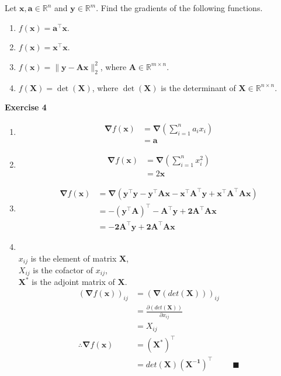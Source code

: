 \documentclass[11pt,letter,notitlepage]{article}
\begin{document}
\begin{exercise} 
	Let $\mathbf{x},\mathbf{a}\in \mathbb{R}^n$ and $\mathbf{y}\in \mathbb{R}^m$. Find the gradients of the following functions.
	\begin{enumerate}
	    \item $f(\mathbf{x}) = \mathbf{a}^{\top}\mathbf{x}$.
	    \item $f(\mathbf{x}) = \mathbf{x}^{\top}\mathbf{x}$.
	    \item $f(\mathbf{x})=\| \mathbf{y} - \mathbf{A}\mathbf{x} \|_2^2$, where $\mathbf{A}\in\mathbb{R}^{m\times n}$.
	    \item  $f(\mathbf{X}) = \det(\mathbf{X})$, where $\det(\mathbf{X})$ is the determinant of $\mathbf{X} \in \mathbb{R}^{n \times n}$.
	\end{enumerate}
\end{exercise}

\begin{solution}
	\textbf{Exercise 4}
	\begin{enumerate}
		\item
		\begin{align*}
			\mathbf{\nabla}f(\mathbf{x})
			&=\mathbf{\nabla}(\sum_{i=1}^{n}{a_ix_i})\\
			&=\mathbf{a}
		\end{align*}
		
		\item
		\begin{align*}
			\mathbf{\nabla}f(\mathbf{x})
			&=\mathbf{\nabla}(\sum_{i=1}^{n}{x_i^2})\\
			&=2\mathbf{x}
		\end{align*}
		
		\item
		\begin{align*}
			\mathbf{\nabla}f(\mathbf{x})
			&=\mathbf{\nabla}(\mathbf{y^{\top}y-y^{\top}Ax-x^{\top}A^{\top}y+x^{\top}A^{\top}Ax})\\
			&=\mathbf{-(y^{\top}A)^{\top}-A^{\top}y+2A^{\top}Ax}\\
			&=\mathbf{-2A^{\top}y+2A^{\top}Ax}
		\end{align*}
		
		\item ~\\
		$x_{ij}$ is the element of matrix $\mathbf{X}$,\\ $X_{ij}$ is the cofactor of $x_{ij}$, \\$\mathbf{X^*}$ is the adjoint matrix of $\mathbf{X}$.
		\begin{align*}
			(\mathbf{\nabla}f(\mathbf{x}))_{ij}
			&=(\mathbf{\nabla}(det(\mathbf{X})))_{ij}\\
			&=\frac{\partial (det(\mathbf{X}))}{\partial x_{ij}}\\
			&=X_{ij}\\
			\therefore \mathbf{\nabla}f(\mathbf{x})
			&=\mathbf{(X^{*})^{\top}}\\
			&=det(\mathbf{X})(\mathbf{X^{-1}})^{\top}~~~~~~~~~~~\blacksquare
		\end{align*}
	\end{enumerate}

\end{solution}
\end{document}
